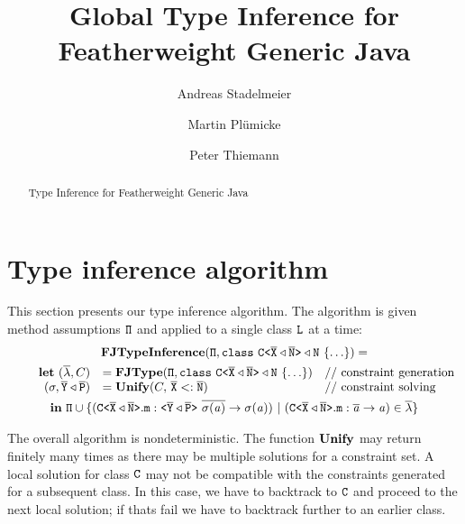 \documentclass[a4paper,USenglish,cleveref, autoref, thm-restate, anonymous]{lipics-v2021}
\title{Global Type Inference for Featherweight Generic Java} %
\author{Andreas Stadelmeier}{DHBW Stuttgart, Campus Horb, Germany}{a.stadelmeier@hb.dhbw-stuttgart.de}{}{}%
\author{Martin Plümicke}{DHBW Stuttgart, Campus Horb, Germany}{pl@dhbw.de}{}{}
\author{Peter Thiemann}{Universität Freiburg, Institut für Informatik, Germany}{thiemann@informatik.uni-freiburg.de}{}{}
\begin{document}
\maketitle

\begin{abstract}
  Type Inference for Featherweight Generic Java
\end{abstract}









\section{Type inference algorithm}
\label{sec:type-infer-algor}
This section presents our type inference algorithm.
The algorithm is given method assumptions ${\tt \Pi}$ and applied to a
single class ${\tt L}$ at a time:
\begin{gather*}
\fjtypeinference(\mv{\Pi}, \texttt{class}\ \exptype{C}{\ol{X}
\triangleleft \ol{N}} \triangleleft \type{N}\ \{ \ldots \}) = \\
\quad \quad \begin{array}[t]{rll}
  \textbf{let}\ 
  (\overline{\methodAssumption}, \consSet) &= \fjtype{}(\mv{\Pi}, \texttt{class}\ \exptype{C}{\ol{X}
  \triangleleft \ol{N}} \triangleleft \type{N}\ \{ \ldots \}) &
                                                                     \text{// constraint generation}\\
              {(\sigma,  \ol{Y} \triangleleft \ol{P})} &= \unify{}(\consSet,\, \ol{X} <: \ol{N}) & \text{// constraint solving}\\
\end{array}\\
\textbf{in}\ \mv\Pi \cup
\set{(\exptype{C}{\ol{X} \triangleleft \ol{N}}.\mv{m} : \exptype{}{\ol{Y} \triangleleft \ol{P}}\ \ol{\sigma(\tv{a})} \to \sigma(\tv{a})) \ |\ (\exptype{C}{\ol{X} \triangleleft \ol{N}}.\mv{m} : \ol{\tv{a}} \to \tv{a}) \in \overline{\methodAssumption}}
\end{gather*}


The overall algorithm is nondeterministic. The function $\textbf{Unify}{}$ may
return finitely many times as there may be multiple solutions for a constraint
set.  A local solution for class ${\tt C}$ may not
be compatible with the constraints generated for a subsequent class. In this case, we have to backtrack to ${\tt C}$ and proceed to the next
local solution; if thats fail we have to backtrack further to an earlier class.
\end{document}
